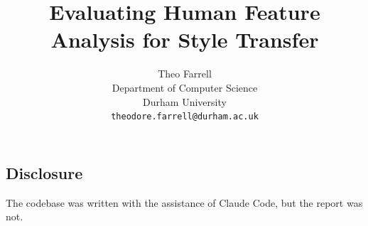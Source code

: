 \documentclass{article}
\title{Evaluating Human Feature Analysis for Style Transfer}
\author{
  Theo Farrell \\
  Department of Computer Science \\
  Durham University \\
  \texttt{theodore.farrell@durham.ac.uk} \\
}
\begin{document}
\maketitle






\subsection*{Disclosure}
The codebase was written with the assistance of Claude Code, but the report was not. 

\newpage


\end{document}
